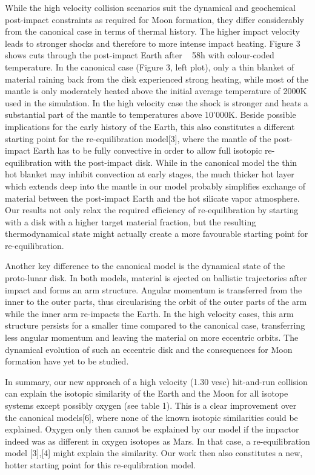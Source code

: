 While the high velocity collision scenarios suit the dynamical and geochemical post-impact constraints as required for Moon formation, they differ considerably from the canonical case in terms of thermal history. The higher impact velocity leads to stronger shocks and therefore to more intense impact heating. Figure 3 shows cuts through the post-impact Earth after ~ 58h with colour-coded temperature. In the canonical case (Figure 3, left plot), only a thin blanket of material raining back from the disk experienced strong heating, while most of the mantle is only moderately heated above the initial average temperature of 2000K used in the simulation. In the high velocity case the shock is stronger and heats a substantial part of the mantle to temperatures above 10'000K. Beside possible implications for the early history of the Earth, this also constitutes a different starting point for the re-equilibration model[3], where the mantle of the post-impact Earth has to be fully convective in order to allow full isotopic re-equilibration with the post-impact disk. While in the canonical model the thin hot blanket may inhibit convection at early stages, the much thicker hot layer which extends deep into the mantle in our model probably simplifies exchange of material between the post-impact Earth and the hot silicate vapor atmosphere. Our results not only relax the required efficiency of re-equilibration by starting with a disk with a higher target material fraction, but the resulting thermodynamical state might actually create a more favourable starting point for re-equilibration.

Another key difference to the canonical model is the dynamical state of the proto-lunar disk. In both models, material is ejected on ballistic trajectories after impact and forms an arm structure. Angular momentum is transferred from the inner to the outer parts, thus circularising the orbit of the outer parts of the arm while the inner arm re-impacts the Earth. In the high velocity cases, this arm structure persists for a smaller time compared to the canonical case, transferring less angular momentum and leaving the material on more eccentric orbits. The dynamical evolution of such an eccentric disk and the consequences for Moon formation have yet to be studied.

In summary, our new approach of a high velocity (1.30 vesc) hit-and-run collision can explain the isotopic similarity of the Earth and the Moon for all isotope systems except possibly oxygen (see table 1). This is a clear improvement over the canonical models[6], where none of the known isotopic similarities could be explained. Oxygen only then cannot be explained by our model if the impactor indeed was as different in oxygen isotopes as Mars. In that case, a re-equilibration model [3],[4] might explain the similarity. Our work then also constitutes a new, hotter starting point for this re-equlibration model. 

